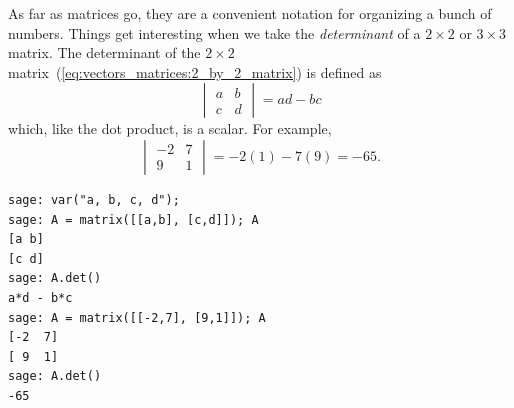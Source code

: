 As far as matrices go, they are a convenient notation for organizing a
bunch of numbers. Things get interesting when we take the
\emph{determinant} of a $2 \times 2$ or
$3 \times 3$ matrix. The determinant of the $2 \times 2$
matrix~(\ref{eq:vectors_matrices:2_by_2_matrix}) is defined as
\[
\begin{vmatrix}
a & b \\
c & d
\end{vmatrix}
=
ad - bc
\]
which, like the dot product, is a scalar. For example,
\[
\begin{vmatrix}
-2 & 7 \\
9  & 1
\end{vmatrix}
=
-2(1) - 7(9)
=
-65.
\]

\begin{lstlisting}
sage: var("a, b, c, d");
sage: A = matrix([[a,b], [c,d]]); A
[a b]
[c d]
sage: A.det()
a*d - b*c
sage: A = matrix([[-2,7], [9,1]]); A
[-2  7]
[ 9  1]
sage: A.det()
-65
\end{lstlisting}

